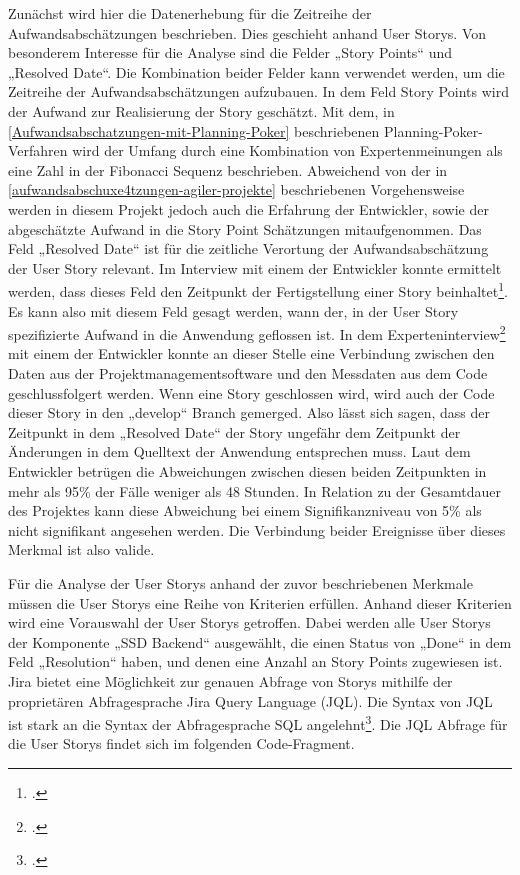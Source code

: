 Zunächst wird hier die Datenerhebung für die Zeitreihe der
Aufwandsabschätzungen beschrieben. Dies geschieht anhand User Storys. Von besonderem Interesse für die Analyse sind
die Felder „Story Points`` und „Resolved Date``. Die Kombination beider
Felder kann verwendet werden, um die Zeitreihe der Aufwandsabschätzungen
aufzubauen. In dem Feld Story Points wird der Aufwand zur Realisierung
der Story geschätzt. Mit dem, in \ref{Aufwandsabschatzungen-mit-Planning-Poker} beschriebenen
Planning-Poker-Verfahren wird der Umfang durch eine Kombination von
Expertenmeinungen als eine Zahl in der Fibonacci Sequenz beschrieben.
Abweichend von der in \ref{aufwandsabschuxe4tzungen-agiler-projekte} beschriebenen Vorgehensweise werden in diesem
Projekt jedoch auch die Erfahrung der Entwickler, sowie der abgeschätzte
Aufwand in die Story Point Schätzungen mitaufgenommen. Das Feld
„Resolved Date`` ist für die zeitliche Verortung der Aufwandsabschätzung
der User Story relevant. Im Interview mit einem der Entwickler konnte
ermittelt werden, dass dieses Feld den Zeitpunkt der Fertigstellung
einer Story beinhaltet\footcite[Vgl. ][]{entwicklerInterviewMitEntwickler2022}. Es kann also mit diesem Feld
gesagt werden, wann der, in der User Story spezifizierte Aufwand in die
Anwendung geflossen ist. In dem Experteninterview\footcite[Vgl. ][]{entwicklerInterviewMitEntwickler2022} mit einem der Entwickler konnte an dieser Stelle eine
Verbindung zwischen den Daten aus der Projektmanagementsoftware und den
Messdaten aus dem Code geschlussfolgert werden. Wenn eine Story
geschlossen wird, wird auch der Code dieser Story in den „develop``
Branch gemerged. Also lässt sich sagen, dass der Zeitpunkt in dem
„Resolved Date`` der Story ungefähr dem Zeitpunkt der Änderungen in dem
Quelltext der Anwendung entsprechen muss. Laut dem Entwickler betrügen
die Abweichungen zwischen diesen beiden Zeitpunkten in mehr als 95\% der
Fälle weniger als 48 Stunden. In Relation zu der Gesamtdauer des
Projektes kann diese Abweichung bei einem Signifikanzniveau von 5\% als
nicht signifikant angesehen werden. Die Verbindung beider Ereignisse
über dieses Merkmal ist also valide.

Für die Analyse der User Storys anhand der zuvor beschriebenen Merkmale
müssen die User Storys eine Reihe von Kriterien erfüllen. Anhand dieser
Kriterien wird eine Vorauswahl der User Storys getroffen. Dabei werden
alle User Storys der Komponente „SSD Backend`` ausgewählt, die einen
Status von „Done`` in dem Feld „Resolution`` haben, und denen eine
Anzahl an Story Points zugewiesen ist. Jira bietet eine Möglichkeit zur
genauen Abfrage von Storys mithilfe der proprietären Abfragesprache Jira
Query Language (JQL). Die Syntax von JQL ist stark an die Syntax der
Abfragesprache SQL angelehnt\footcite[Vgl. ][]{atlassianptyltdUseAdvancedSearch2022}.
Die JQL Abfrage für die User Storys findet sich im folgenden Code-Fragment.

